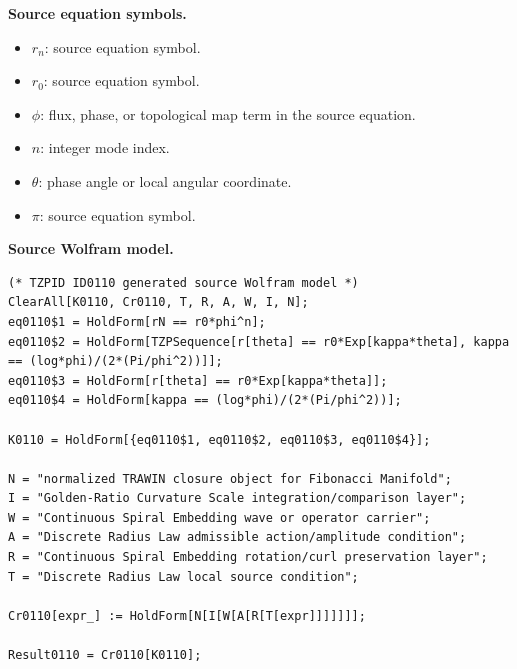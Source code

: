 \begin{minipage}[t]{0.49\linewidth}
\begingroup
\small
\raggedright
\textbf{Source equation symbols.}\par
\begin{itemize}[leftmargin=1.35em,itemsep=1pt,topsep=1pt,parsep=0pt]
    \item $r_n$: source equation symbol.
    \item $r_0$: source equation symbol.
    \item $\phi$: flux, phase, or topological map term in the source equation.
    \item $n$: integer mode index.
    \item $\theta$: phase angle or local angular coordinate.
    \item $\pi$: source equation symbol.
\end{itemize}
\endgroup
\end{minipage}\hfill
\begin{minipage}[t]{0.47\linewidth}
\begingroup
\scriptsize
\raggedright
\textbf{Source Wolfram model.}\par
\begin{Verbatim}[fontsize=\tiny,breaklines=true,breakanywhere=true]
(* TZPID ID0110 generated source Wolfram model *)
ClearAll[K0110, Cr0110, T, R, A, W, I, N];
eq0110$1 = HoldForm[rN == r0*phi^n];
eq0110$2 = HoldForm[TZPSequence[r[theta] == r0*Exp[kappa*theta], kappa == (log*phi)/(2*(Pi/phi^2))]];
eq0110$3 = HoldForm[r[theta] == r0*Exp[kappa*theta]];
eq0110$4 = HoldForm[kappa == (log*phi)/(2*(Pi/phi^2))];

K0110 = HoldForm[{eq0110$1, eq0110$2, eq0110$3, eq0110$4}];

N = "normalized TRAWIN closure object for Fibonacci Manifold";
I = "Golden-Ratio Curvature Scale integration/comparison layer";
W = "Continuous Spiral Embedding wave or operator carrier";
A = "Discrete Radius Law admissible action/amplitude condition";
R = "Continuous Spiral Embedding rotation/curl preservation layer";
T = "Discrete Radius Law local source condition";

Cr0110[expr_] := HoldForm[N[I[W[A[R[T[expr]]]]]]];

Result0110 = Cr0110[K0110];
\end{Verbatim}
\endgroup
\end{minipage}

